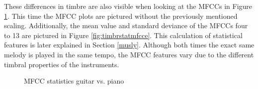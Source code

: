 \FloatBarrier
These differences in timbre are also visible when looking at the MFCCs in Figure \ref{fig:timbrmfcce}. This time the MFCC plots are pictured without the previously mentioned scaling. Additionally, the mean value and standard deviance of the MFCCs four to 13 are pictured in Figure \ref{fig:timbrstatmfcce}. This calculation of statistical features is later explained in Section \ref{musly}. Although both times the exact same melody is played in the same tempo, the MFCC features vary due to the different timbral properties of the instruments. 
\begin{figure}[htbp]
	\centering
	\caption{MFCC statistics guitar vs. piano}	
	\label{fig:timbrmfcce}
\end{figure}
\FloatBarrier

